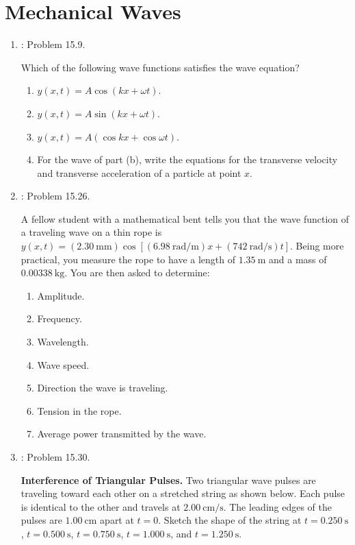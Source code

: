 \documentclass[../psets.tex]{subfiles}
\begin{document}
\section{Mechanical Waves}
\begin{enumerate}[label={\arabic*)}]
    \item {}\textcite{bib:YoungFreedman}: Problem 15.9.\par
    Which of the following wave functions satisfies the wave equation?
    \begin{enumerate}
        \item $y(x,t)=A\cos(kx+\omega t)$.
        \item $y(x,t)=A\sin(kx+\omega t)$.
        \item $y(x,t)=A(\cos kx+\cos\omega t)$.
        \item For the wave of part (b), write the equations for the transverse velocity and transverse acceleration of a particle at point $x$.
    \end{enumerate}
    \item \textcite{bib:YoungFreedman}: Problem 15.26.\par
    A fellow student with a mathematical bent tells you that the wave function of a traveling wave on a thin rope is $y(x,t)=(\SI{2.30}{\milli\meter})\cos[(\SI{6.98}{\radian\per\meter})x+(\SI{742}{\radian\per\second})t]$. Being more practical, you measure the rope to have a length of $\SI{1.35}{\meter}$ and a mass of $\SI{0.00338}{\kilo\gram}$. You are then asked to determine:
    \begin{enumerate}
        \item Amplitude.
        \item Frequency.
        \item Wavelength.
        \item Wave speed.
        \item Direction the wave is traveling.
        \item Tension in the rope.
        \item Average power transmitted by the wave.
    \end{enumerate}
    \item \textcite{bib:YoungFreedman}: Problem 15.30.\par
    \textbf{Interference of Triangular Pulses.} Two triangular wave pulses are traveling toward each other on a stretched string as shown below. Each pulse is identical to the other and travels at $\SI{2.00}{\centi\meter\per\second}$. The leading edges of the pulses are $\SI{1.00}{\centi\meter}$ apart at $t=0$. Sketch the shape of the string at $t=\SI{0.250}{\second}$, $t=\SI{0.500}{\second}$, $t=\SI{0.750}{\second}$, $t=\SI{1.000}{\second}$, and $t=\SI{1.250}{\second}$.
    \begin{center}
\end{center}
\end{enumerate}
\end{document}
